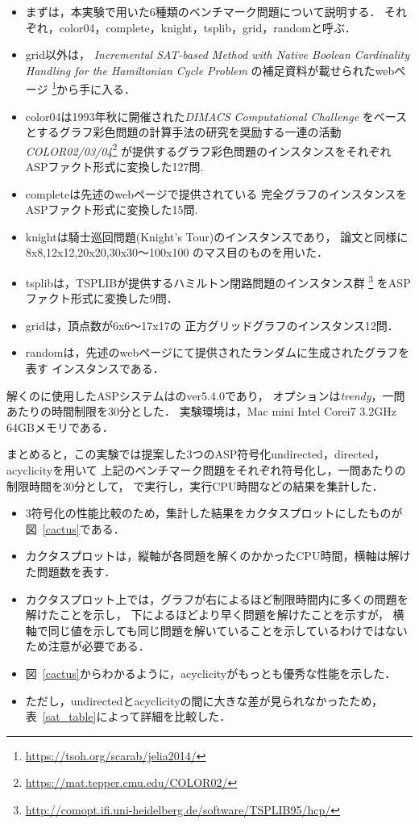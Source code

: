\begin{itemize}
\item まずは，本実験で用いた6種類のベンチマーク問題について説明する．
それぞれ，color04，complete，knight，tsplib，grid，randomと呼ぶ．
\item grid以外は，
  \textit{Incremental SAT-based Method with
    Native Boolean Cardinality Handling for
    the Hamiltonian Cycle Problem}\cite{soh14:jelia2014}
  の補足資料が載せられたwebページ
  \footnote{\url{https://tsoh.org/scarab/jelia2014/}}から手に入る．
\item color04は1993年秋に開催された\textit{DIMACS Computational Challenge}
  をベースとするグラフ彩色問題の計算手法の研究を奨励する一連の活動
  \textit{COLOR02/03/04}\footnote{\url{https://mat.tepper.cmu.edu/COLOR02/}}
  が提供するグラフ彩色問題のインスタンスをそれぞれASPファクト形式に変換した127問.
\item completeは先述のwebページ\footnotemark[1]で提供されている
  完全グラフのインスタンスをASPファクト形式に変換した15問.
\item knightは騎士巡回問題(Knight's Tour)のインスタンスであり，
  論文\cite{soh14:jelia2014}と同様に8x8,12x12,20x20,30x30〜100x100
  のマス目のものを用いた．
\item tsplibは，TSPLIBが提供するハミルトン閉路問題のインスタンス群
  \footnote{\url{http://comopt.ifi.uni-heidelberg.de/software/TSPLIB95/hcp/}}
  をASPファクト形式に変換した9問．
\item gridは，頂点数が6x6〜17x17の
  正方グリッドグラフのインスタンス12問．
\item randomは，先述のwebページ\footnotemark[1]
  にて提供されたランダムに生成されたグラフを表す
  インスタンスである．
\end{itemize}

解くのに使用したASPシステムは{\clingo}のver5.4.0であり，
オプションは\textit{trendy}，一問あたりの時間制限を30分とした．
実験環境は，Mac mini Intel Corei7 3.2GHz 64GBメモリである．

まとめると，この実験では提案した3つのASP符号化\textsf{undirected}，\textsf{directed}，\textsf{acyclicity}を用いて
上記のベンチマーク問題をそれぞれ符号化し，一問あたりの制限時間を30分として，
{\clingo}で実行し，実行CPU時間などの結果を集計した．

\begin{itemize}
\item 3符号化の性能比較のため，集計した結果をカクタスプロットにしたものが図~\ref{cactus}である．
\item カクタスプロットは，縦軸が各問題を解くのかかったCPU時間，横軸は解けた問題数を表す．
\item カクタスプロット上では，グラフが右によるほど制限時間内に多くの問題を解けたことを示し，
  下によるほどより早く問題を解けたことを示すが，
  横軸で同じ値を示しても同じ問題を解いていることを示しているわけではないため注意が必要である．
\item 図~\ref{cactus}からわかるように，\textsf{acyclicity}がもっとも優秀な性能を示した．
\item ただし，\textsf{undirected}と\textsf{acyclicity}の間に大きな差が見られなかったため，
  表~\ref{sat_table}によって詳細を比較した．
\end{itemize}

